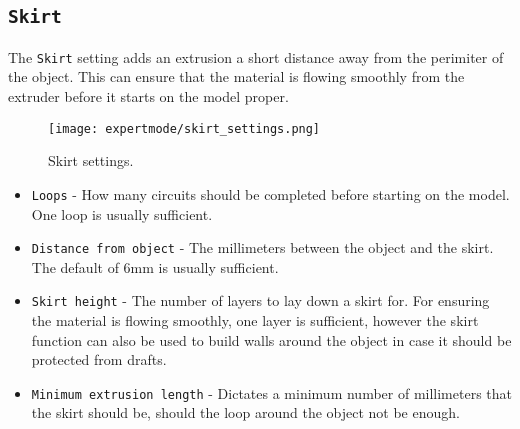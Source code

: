 
\subsection{\texttt{Skirt}} %
\label{sec:skirt}

The \texttt{Skirt} setting adds an extrusion a short distance away from the perimiter of the object.  This can ensure that the material is flowing smoothly from the extruder before it starts on the model proper.

\begin{figure}[H]
\centering
\texttt{[image: expertmode/skirt\_settings.png]}
\caption{Skirt settings.}
\label{fig:skirt_settings}
\end{figure}

\begin{itemize}
    \item \texttt{Loops} - How many circuits should be completed before starting on the model.  One loop is usually sufficient.
    \item \texttt{Distance from object} - The millimeters between the object and the skirt.  The default of 6mm is usually sufficient.
    \item \texttt{Skirt height} - The number of layers to lay down a skirt for.  For ensuring the material is flowing smoothly, one layer is sufficient, however the skirt function can also be used to build walls around the object in case it should be protected from drafts.
    \item \texttt{Minimum extrusion length} - Dictates a minimum number of millimeters that the skirt should be, should the loop around the object not be enough.
\end{itemize}

